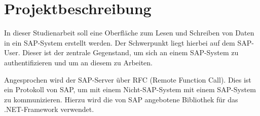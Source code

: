 \section{Projektbeschreibung}

In dieser Studienarbeit soll eine Oberfläche zum Lesen und Schreiben von Daten in ein SAP-System erstellt werden. Der Schwerpunkt liegt hierbei auf dem SAP-User. Dieser ist der zentrale Gegenstand, um sich an einem SAP-System zu authentifizieren und um an diesem zu Arbeiten. 

Angesprochen wird der SAP-Server über RFC (Remote Function Call). Dies ist ein Protokoll von SAP, um mit einem Nicht-SAP-System mit einem SAP-System zu kommunizieren. Hierzu wird die von SAP angebotene Bibliothek für das .NET-Framework verwendet.


